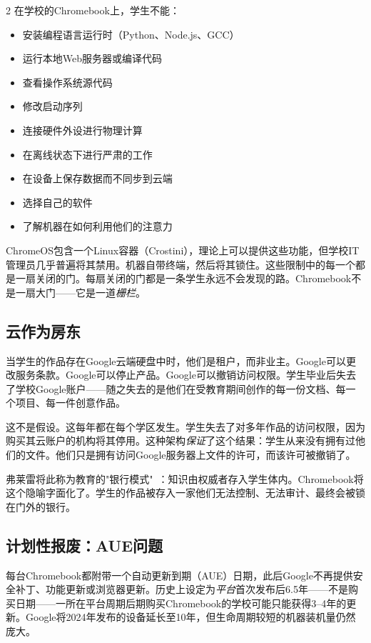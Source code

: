 \documentclass[11pt, a4paper]{article}
\begin{document}
\begin{multicols}{2}
在学校的Chromebook上，学生不能：

\begin{itemize}
  \item 安装编程语言运行时（Python、Node.js、GCC）
  \item 运行本地Web服务器或编译代码
  \item 查看操作系统源代码
  \item 修改启动序列
  \item 连接硬件外设进行物理计算
  \item 在离线状态下进行严肃的工作
  \item 在设备上保存数据而不同步到云端
  \item 选择自己的软件
  \item 了解机器在如何利用他们的注意力
\end{itemize}

ChromeOS包含一个Linux容器（Crostini），理论上可以提供这些功能，但学校IT管理员几乎普遍将其禁用。机器自带终端，然后将其锁住。这些限制中的每一个都是一扇关闭的门。每扇关闭的门都是一条学生永远不会发现的路。Chromebook不是一扇大门——它是一道\emph{栅栏}。

\subsection{云作为房东}

当学生的作品存在Google云端硬盘中时，他们是租户，而非业主。Google可以更改服务条款。Google可以停止产品。Google可以撤销访问权限。学生毕业后失去了学校Google账户——随之失去的是他们在受教育期间创作的每一份文档、每一个项目、每一件创意作品。

这不是假设。这每年都在每个学区发生。学生失去了对多年作品的访问权限，因为购买其云账户的机构将其停用。这种架构\emph{保证}了这个结果：学生从来没有拥有过他们的文件。他们只是拥有访问Google服务器上文件的许可，而该许可被撤销了。

弗莱雷将此称为教育的"银行模式"~\citep{freire1970pedagogy}：知识由权威者存入学生体内。Chromebook将这个隐喻字面化了。学生的作品被存入一家他们无法控制、无法审计、最终会被锁在门外的银行。

\subsection{计划性报废：AUE问题}

每台Chromebook都附带一个自动更新到期（AUE）日期，此后Google不再提供安全补丁、功能更新或浏览器更新。历史上设定为\emph{平台}首次发布后6.5年——不是购买日期——一所在平台周期后期购买Chromebook的学校可能只能获得3--4年的更新。Google将2024年发布的设备延长至10年，但生命周期较短的机器装机量仍然庞大。


\end{multicols}
\end{document}
